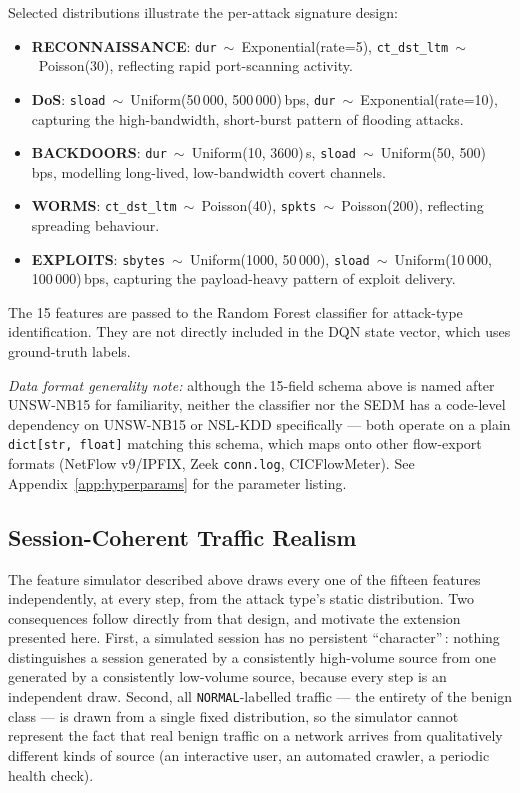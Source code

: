 Selected distributions illustrate the per-attack signature design:

\begin{itemize}
  \item \textbf{RECONNAISSANCE}: \texttt{dur}~$\sim$~Exponential(rate=5),
        \texttt{ct\_dst\_ltm}~$\sim$~Poisson(30), reflecting rapid
        port-scanning activity.
  \item \textbf{DoS}: \texttt{sload}~$\sim$~Uniform(50\,000, 500\,000)\,bps,
        \texttt{dur}~$\sim$~Exponential(rate=10), capturing the high-bandwidth,
        short-burst pattern of flooding attacks.
  \item \textbf{BACKDOORS}: \texttt{dur}~$\sim$~Uniform(10, 3600)\,s,
        \texttt{sload}~$\sim$~Uniform(50, 500)\,bps, modelling long-lived,
        low-bandwidth covert channels.
  \item \textbf{WORMS}: \texttt{ct\_dst\_ltm}~$\sim$~Poisson(40),
        \texttt{spkts}~$\sim$~Poisson(200), reflecting spreading behaviour.
  \item \textbf{EXPLOITS}: \texttt{sbytes}~$\sim$~Uniform(1000, 50\,000),
        \texttt{sload}~$\sim$~Uniform(10\,000, 100\,000)\,bps, capturing
        the payload-heavy pattern of exploit delivery.
\end{itemize}

The 15 features are passed to the Random Forest classifier for attack-type
identification.
They are not directly included in the DQN state vector, which uses
ground-truth labels.

\textit{Data format generality note:} although the 15-field schema above is
named after UNSW-NB15 for familiarity, neither the classifier nor the SEDM
has a code-level dependency on UNSW-NB15 or NSL-KDD specifically — both
operate on a plain \texttt{dict[str, float]} matching this schema, which maps
onto other flow-export formats (NetFlow v9/IPFIX, Zeek \texttt{conn.log},
CICFlowMeter). See Appendix~\ref{app:hyperparams} for the parameter
listing.

\subsection{Session-Coherent Traffic Realism}
\label{sec:realism}

The feature simulator described above draws every one of the fifteen
features independently, at every step, from the attack type's static
distribution. Two consequences follow directly from that design, and
motivate the extension presented here. First, a simulated session has no
persistent ``character''\,: nothing distinguishes a session generated by a
consistently high-volume source from one generated by a consistently
low-volume source, because every step is an independent draw. Second, all
\texttt{NORMAL}-labelled traffic — the entirety of the benign class — is
drawn from a single fixed distribution, so the simulator cannot represent
the fact that real benign traffic on a network arrives from qualitatively
different kinds of source (an interactive user, an automated crawler, a
periodic health check).


